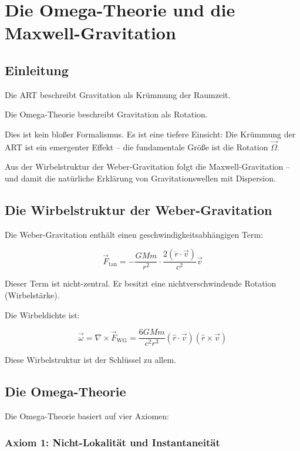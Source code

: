 \chapter{Die Omega-Theorie und die Maxwell-Gravitation}

\section{Einleitung}

Die ART beschreibt Gravitation als Krümmung der Raumzeit.

Die Omega-Theorie beschreibt Gravitation als Rotation.

Dies ist kein bloßer Formalismus. Es ist eine tiefere Einsicht: Die Krümmung der ART ist ein emergenter Effekt – die fundamentale Größe ist die Rotation \( \vec{\Omega} \).

Aus der Wirbelstruktur der Weber-Gravitation folgt die Maxwell-Gravitation – und damit die natürliche Erklärung von Gravitationswellen mit Dispersion.

\section{Die Wirbelstruktur der Weber-Gravitation}

Die Weber-Gravitation enthält einen geschwindigkeitsabhängigen Term:

\[
\vec{F}_{\text{tan}} = -\frac{GMm}{r^2} \cdot \frac{2(\dot{r} \cdot \vec{v})}{c^2} \vec{v}
\]

Dieser Term ist nicht-zentral. Er besitzt eine nichtverschwindende Rotation (Wirbelstärke).

Die Wirbeldichte ist:

\[
\vec{\omega} = \nabla \times \vec{F}_{\text{WG}}
= \frac{6GMm}{c^2 r^3} (\hat{r} \cdot \vec{v})(\hat{r} \times \vec{v})
\]

Diese Wirbelstruktur ist der Schlüssel zu allem.

\section{Die Omega-Theorie}

Die Omega-Theorie basiert auf vier Axiomen:

\subsection{Axiom 1: Nicht-Lokalität und Instantaneität}

